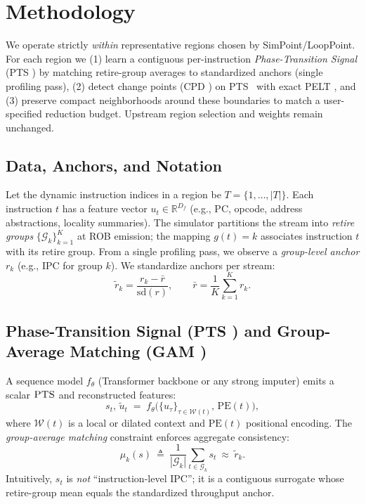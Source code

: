 \documentclass[conference]{IEEEtran}
\newcommand{\pts}{\textsc{PTS} }
\newcommand{\gam}{\textsc{GAM} }
\newcommand{\cpd}{\textsc{CPD} }
\newcommand{\pelt}{\textsc{PELT} }
\begin{document}
\section{Methodology}
\label{sec:methodology}

We operate strictly \emph{within} representative regions chosen by SimPoint/LoopPoint. For each region we (1) learn a contiguous per-instruction \emph{Phase-Transition Signal} (\pts) by matching retire-group averages to standardized anchors (single profiling pass), (2) detect change points (\cpd) on \pts\ with exact \pelt, and (3) preserve compact neighborhoods around these boundaries to match a user-specified reduction budget. Upstream region selection and weights remain unchanged.

\subsection{Data, Anchors, and Notation}
Let the dynamic instruction indices in a region be \(T=\{1,\ldots,|T|\}\). Each instruction \(t\) has a feature vector \(u_t\in\mathbb{R}^{D_f}\) (e.g., PC, opcode, address abstractions, locality summaries). The simulator partitions the stream into \emph{retire groups} \(\{\mathcal{G}_k\}_{k=1}^K\) at ROB emission; the mapping \(g(t)=k\) associates instruction \(t\) with its retire group. From a single profiling pass, we observe a \emph{group-level anchor} \(r_k\) (e.g., IPC for group \(k\)). We standardize anchors per stream:
\[
\tilde{r}_k=\frac{r_k-\bar{r}}{\mathrm{sd}(r)},\qquad \bar{r}=\frac{1}{K}\sum_{k=1}^{K}r_k.
\]

\subsection{Phase-Transition Signal (\pts) and Group-Average Matching (\gam)}
A sequence model \(f_\theta\) (Transformer backbone or any strong imputer) emits a scalar \(\pts\) and reconstructed features:
\[
s_t,\,\tilde{u}_t \;=\; f_\theta\!\big(\{u_\tau\}_{\tau\in\mathcal{W}(t)},\,\mathrm{PE}(t)\big),
\]
where \(\mathcal{W}(t)\) is a local or dilated context and \(\mathrm{PE}(t)\) positional encoding. The \emph{group-average matching} constraint enforces aggregate consistency:
\begin{equation}
\mu_k(s)\ \triangleq\ \frac{1}{|\mathcal{G}_k|}\sum_{t\in\mathcal{G}_k}s_t\ \approx\ \tilde{r}_k.
\label{eq:group-avg}
\end{equation}
Intuitively, \(s_t\) is \emph{not} “instruction-level IPC”; it is a contiguous surrogate whose retire-group mean equals the standardized throughput anchor.
\end{document}
